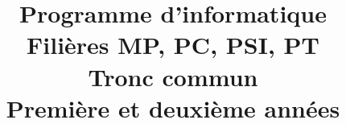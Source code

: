 \documentclass[a4paper]{article}
\begin{document}
\title{Programme d'informatique\\Filières MP, PC, PSI, PT\\Tronc commun\\Première et deuxième années}

\maketitle
\thispagestyle{fancy}
\clearpage

\tableofcontents
\clearpage


\clearpage

\clearpage

\clearpage



\clearpage
\appendix

\end{document}
